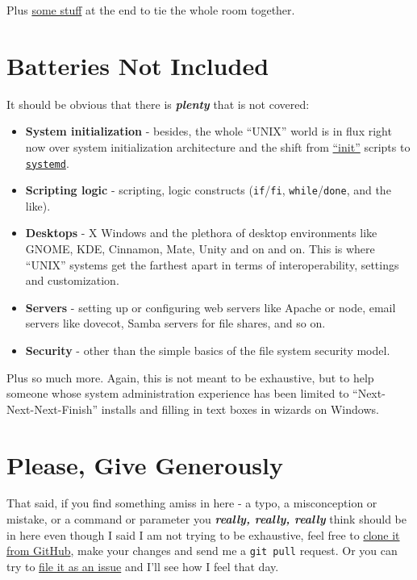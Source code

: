 \documentclass[10pt,]{book}
\numberwithin{figure}{chapter}
\begin{document}
Plus \hyperref[appendices]{some stuff} at the end to tie the whole room
together.

\section{Batteries Not Included}\label{batteries-not-included}

It should be obvious that there is \textbf{\emph{plenty}} that is not
covered:

\begin{itemize}
\item
  \textbf{System initialization} - besides, the whole ``UNIX'' world is
  in flux right now over system initialization architecture and the
  shift from \href{https://en.wikipedia.org/wiki/Init}{``init''} scripts
  to \href{https://en.wikipedia.org/wiki/Systemd}{\texttt{systemd}}.
\item
  \textbf{Scripting logic} - scripting, logic constructs
  (\texttt{if}/\texttt{fi}, \texttt{while}/\texttt{done}, and the like).
\item
  \textbf{Desktops} - X Windows and the plethora of desktop environments
  like GNOME, KDE, Cinnamon, Mate, Unity and on and on. This is where
  ``UNIX'' systems get the farthest apart in terms of interoperability,
  settings and customization.
\item
  \textbf{Servers} - setting up or configuring web servers like Apache
  or node, email servers like dovecot, Samba servers for file shares,
  and so on.
\item
  \textbf{Security} - other than the simple basics of the file system
  security model.
\end{itemize}

Plus so much more. Again, this is not meant to be exhaustive, but to
help someone whose system administration experience has been limited to
``Next-Next-Next-Finish'' installs and filling in text boxes in wizards
on Windows.

\section{Please, Give Generously}\label{please-give-generously}

That said, if you find something amiss in here - a typo, a misconception
or mistake, or a command or parameter you \textbf{\emph{really, really,
really}} think should be in here even though I said I am not trying to
be exhaustive, feel free to
\href{https://github.com/dullroar/ten-steps-to-linux-survival.git}{clone
it from GitHub}, make your changes and send me a \texttt{git pull}
request. Or you can try to
\href{https://github.com/dullroar/ten-steps-to-linux-survival/issues?q=is\%3Aopen+is\%3Aissue}{file
it as an issue} and I'll see how I feel that day.
\end{document}
